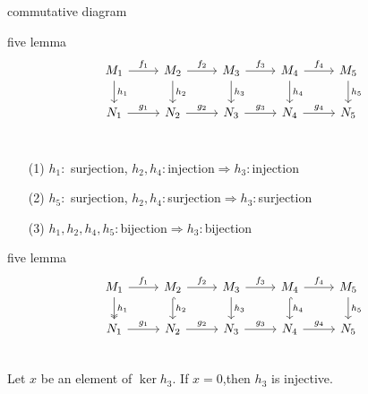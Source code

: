 \documentclass[unicode]{beamer}
\begin{document}
	\begin{frame}[fragile]{commutative diagram}%
		\begin{block}{five lemma}
			\[ 
				\begin{tikzcd}
					M_1 \arrow[r,"f_1"]\arrow[d,"h_1"] & M_2 \arrow[r,"f_2"]\arrow[d,"h_2"] & M_3 \arrow[r,"f_3"]\arrow[d,"h_3"] & M_4\arrow[r,"f_4"]\arrow[d,"h_4"] & M_5 \arrow[d,"h_5"]\\
					N_1 \arrow[r,"g_1"] & N_2 \arrow[r,"g_2"] & N_3 \arrow[r,"g_3"] & N_4\arrow[r,"g_4"] & N_5 \\
				\end{tikzcd}
		\]
		\vspace{-35pt}
		\begin{enumerate}
			\item[(1)]
				$h_1\colon$ surjection, $h_2,h_4\colon$injection$\Longrightarrow h_3\colon $injection
			\item[(2)]
				$h_5\colon$ surjection, $h_2,h_4\colon$surjection$\Longrightarrow h_3\colon $surjection
			\item[(3)]
				 $h_1,h_2,h_4,h_5\colon$bijection$\Longrightarrow h_3\colon $bijection
		\end{enumerate}
		\end{block}
	\end{frame}
	\begin{frame}[fragile]{five lemma}
			\[ 
				\begin{tikzcd}
					M_1 \arrow[r,"f_1"]\arrow[d,two heads,"h_1"] & M_2 \arrow[r,"f_2"]\arrow[d,hook,"h_2"] & M_3 \arrow[r,"f_3"]\arrow[d,"h_3"] & M_4\arrow[r,"f_4"]\arrow[d,hook,"h_4"] & M_5 \arrow[d,"h_5"]\\
					N_1 \arrow[r,"g_1"] & N_2 \arrow[r,"g_2"] & N_3 \arrow[r,"g_3"] & N_4\arrow[r,"g_4"] & N_5 \\
				\end{tikzcd}
		\]
		Let $x$ be an element of $\ker h_3$. If $x=0$,then $h_3$ is injective.
	\end{frame}
\end{document}
